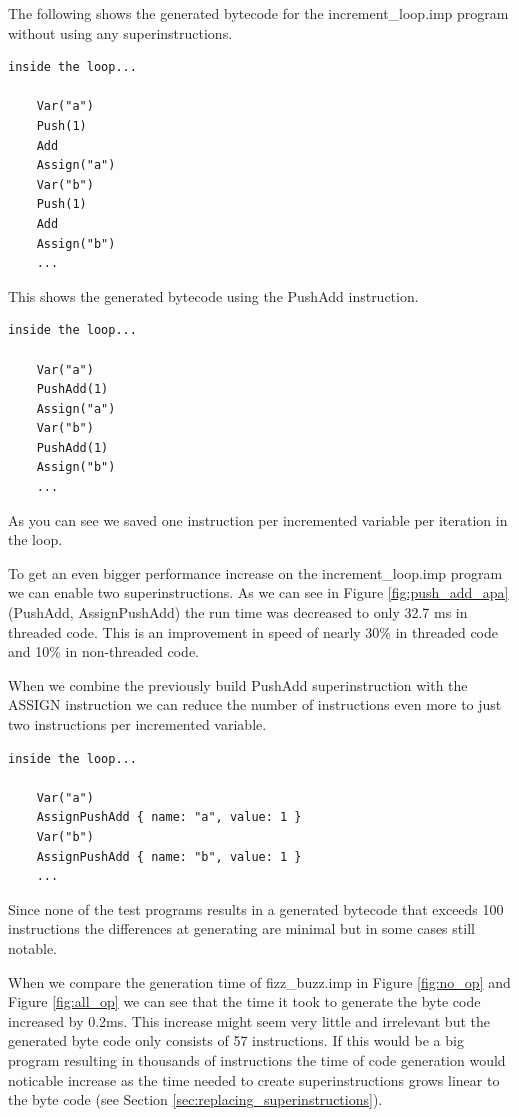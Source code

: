 \documentclass{article}
\begin{document}
The following shows the generated bytecode for the increment\_loop.imp program
without using any superinstructions.
\begin{verbatim}
inside the loop...

    Var("a")
    Push(1)
    Add
    Assign("a")
    Var("b")
    Push(1)
    Add
    Assign("b")
    ...
\end{verbatim}

This shows the generated bytecode using the PushAdd instruction.
\begin{verbatim}
inside the loop...

    Var("a")
    PushAdd(1)
    Assign("a")
    Var("b")
    PushAdd(1)
    Assign("b")
    ...
\end{verbatim}

As you can see we saved one instruction per incremented variable per
iteration in the loop. 

To get an even bigger performance increase on the increment\_loop.imp program
we can enable two superinstructions. As we can see in Figure
\ref{fig:push_add_apa} (PushAdd, AssignPushAdd) the run time was decreased to
only 32.7 ms in threaded code. This is an improvement in speed of nearly 30\%
in threaded code and 10\% in non-threaded code.

When we combine the previously build PushAdd superinstruction with the ASSIGN
instruction we can reduce the number of instructions even more to just two
instructions per incremented variable.

\begin{verbatim}
inside the loop...

    Var("a")
    AssignPushAdd { name: "a", value: 1 }
    Var("b")
    AssignPushAdd { name: "b", value: 1 }
    ...
\end{verbatim}

Since none of the test programs results in a generated bytecode that exceeds
100 instructions the differences at generating are minimal but in some cases
still notable.

When we compare the generation time of fizz\_buzz.imp in Figure \ref{fig:no_op}
and Figure \ref{fig:all_op} we can see that the time it took to generate the
byte code increased by 0.2ms. This increase might seem very little and
irrelevant but the generated byte code only consists of 57 instructions. If
this would be a big program resulting in thousands of instructions the time of
code generation would noticable increase as the time needed to create
superinstructions grows linear to the byte code (see Section
\ref{sec:replacing_superinstructions}).
\end{document}
